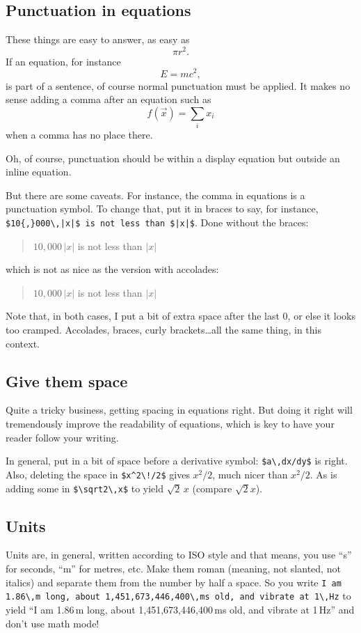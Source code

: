 \documentclass{article}
\begin{document}
\subsection{Punctuation in equations}

These things are easy to answer, as easy as
$$ \pi r^2.$$
If an equation, for instance
$$ E = m c^2, $$
is part of a sentence, of course normal punctuation must be applied.  It makes no sense adding a comma after an equation such as 
$$ f(\vec x) = \sum_i x_i $$
when a comma has no place there.

Oh, of course, punctuation should be within a display equation but outside an inline equation.

But there are some caveats.  For instance, the comma in equations is a punctuation symbol. To change that, put it in braces to say, for instance, \verb+$10{,}000\,|x|$ is not less than $|x|$+.  Done without the braces:
\begin{quotation}
$10,000\,|x|$ is not less than $|x|$
\end{quotation}
which is not as nice as the version with accolades:
\begin{quotation}
$10{,}000\,|x|$ is not less than $|x|$
\end{quotation}
Note that, in both cases, I put a bit of extra space after the last 0, or else it looks too cramped.  Accolades, braces, curly brackets\dots all the same thing, in this context.

\subsection{Give them space}
Quite a tricky business, getting spacing in equations right.  But doing it right will tremendously improve the readability of equations, which is key to have your reader follow your writing.

In general, put in a bit of space before a derivative symbol: \verb+$a\,dx/dy$+ is right. Also, deleting the space in \verb+$x^2\!/2$+ gives $x^2\!/2$, much nicer than $x^2/2$. As is adding some in \verb+$\sqrt2\,x$+ to yield $\sqrt2\,x$ (compare $\sqrt2x$).

\subsection{Units}
Units are, in general, written according to ISO style and that means, you use ``s'' for seconds, ``m'' for metres, etc.  Make them roman (meaning, not slanted, not italics) and separate them from the number by half a space.  So you write \texttt{I am }\verb+1.86\,m+\texttt{ long, about }\verb+1,451,673,446,400\,ms+\texttt{ old, and vibrate at }\verb+1\,Hz+ to yield ``I am 1.86\,m long, about 1,451,673,446,400\,ms old, and vibrate at 1\,Hz'' and don't use math mode!  
\end{document}
